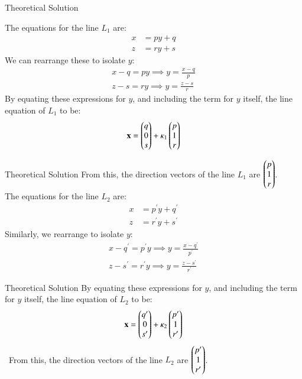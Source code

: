 \documentclass{beamer}
\begin{document}
\begin{frame}{Theoretical Solution}

The equations for the line $L_1$ are:
\begin{align}
    x &= py + q \\
    z &= ry + s
\end{align}
We can rearrange these to isolate $y$:
\begin{align}
    x - q = py \implies y = \frac{x-q}{p} \\
    z - s = ry \implies y = \frac{z-s}{r}
\end{align}
By equating these expressions for $y$, and including the term for $y$ itself, the line equation of $L_1$ to be:
\begin{align}
	\mathbf{x} = \begin{pmatrix}q \\ 0 \\ s\end{pmatrix} + \kappa_1 \begin{pmatrix}p \\ 1 \\ r\end{pmatrix}
\end{align}
\end{frame}
\begin{frame}{Theoretical Solution}
From this, the direction vectors of the line $L_1$ are $\begin{pmatrix}p\\1\\r\end{pmatrix}$.\\
The equations for the line $L_2$ are:
\begin{align}
    x &= p^{\prime}y + q^{\prime} \\
    z &= r^{\prime}y + s^{\prime}
\end{align}
Similarly, we rearrange to isolate $y$:
\begin{align}
    x - q^{\prime} = p^{\prime}y \implies y = \frac{x-q^{\prime}}{p^{\prime}} \\
    z - s^{\prime} = r^{\prime}y \implies y = \frac{z-s^{\prime}}{r^{\prime}}
\end{align}

\end{frame}

\begin{frame}{Theoretical Solution}
By equating these expressions for $y$, and including the term for $y$ itself, the line equation of $L_2$ to be:
\begin{align}
	\mathbf{x} = \begin{pmatrix}q^{\prime}\\ 0 \\ s^{\prime}\end{pmatrix} + \kappa_2 \begin{pmatrix}p^{\prime} \\ 1 \\ r^{\prime}\end{pmatrix}
\end{align}\
From this, the direction vectors of the line $L_2$ are $\begin{pmatrix}p^{\prime}\\1\\r^{\prime}\end{pmatrix}$.
\end{frame}
\end{document}
